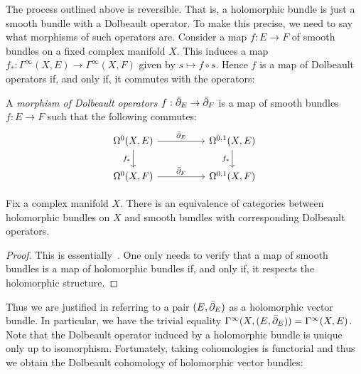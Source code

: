 \documentclass[12pt]{ociamthesis}  %
\begin{document}
The process outlined above is reversible. That is, a holomorphic
bundle is just a smooth bundle with a Dolbeault operator. To make
this precise, we need to say what morphisms of such operators are.
Consider a map $f : E \to F$ of smooth bundles on a fixed complex
manifold $X$. This induces a map
$f_*:\Gamma^\infty(X,E)\to\Gamma^\infty(X,F)$
given by $s \mapsto f\circ s$. Hence $f$ is a map of Dolbeault operators
if, and only if, it commutes with the operators:

\begin{definition}
  A \emph{morphism of Dolbeault operators} $f : {\bar{\partial}}_E \to {\bar{\partial}}_F$
  is a map of smooth bundles $f : E\to F$ such that the following commutes:
  \begin{equation*}
    \begin{tikzcd}
      {\Omega^0(X,E)} && {\Omega^{0,1}(X,E)} \\
      {\Omega^0(X,F)} && {\Omega^{0,1}(X,F)}
      \arrow["{\bar\partial_E}", from=1-1, to=1-3]
      \arrow["{f_*}"', from=1-1, to=2-1]
      \arrow["{f_*}"', from=1-3, to=2-3]
      \arrow["{\bar\partial_F}", from=2-1, to=2-3]
    \end{tikzcd}
  \end{equation*}
\end{definition}

\begin{theorem}
  Fix a complex manifold $X$. There is an equivalence of categories
  between holomorphic bundles on $X$ and smooth bundles with corresponding
  Dolbeault operators.
  \begin{proof}
    This is essentially~\cite[Theorem 3.2]{moroianu2004}. One only
    needs to verify that a map of smooth bundles is a map of
    holomorphic bundles if, and only if, it respects the holomorphic
    structure. 
  \end{proof}
\end{theorem}

Thus we are justified in referring to a pair $(E,{\bar{\partial}}_E)$ as a
holomorphic vector bundle. In particular, we have the trivial
equality $\Gamma^\infty(X,(E,{\bar{\partial}}_E)) = \Gamma^\infty(X,E)$.
Note that the Dolbeault operator induced by a holomorphic bundle is
unique only up to isomorphism. Fortunately, taking cohomologies
is functorial and thus we obtain the Dolbeault cohomology of
holomorphic vector bundles:
\end{document}
